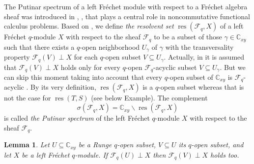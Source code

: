 \documentclass[12pt,reqno]{amsart}%
\theoremstyle{plain}
\newtheorem{lemma}{Lemma}
\numberwithin{theorem}{section} \numberwithin{equation}{section}
\numberwithin{lemma}{section}
\numberwithin{remark}{section}
\numberwithin{example}{section}
\numberwithin{proposition}{section}
\numberwithin{definition}{section}
\numberwithin{corollary}{section}
\begin{document}
The Putinar spectrum of a left Fr\'{e}chet module with respect to a
Fr\'{e}chet algebra sheaf was introduced in \cite{DosiMS10}, \cite{DosJOT10},
that plays a central role in noncommutative functional calculus problems.
Based on \cite[Definition 4.2]{DosJOT10}, we define \textit{the resolvent set
}$\operatorname*{res}\left(  \mathcal{F}_{q},X\right)  $ of a left Fr\'{e}chet
$q$-module $X$ with respect to the sheaf $\mathcal{F}_{q}$ to be a subset of
those $\gamma\in\mathbb{C}_{xy}$ such that there exists a $q$-open
neighborhood $U_{\gamma}$ of $\gamma$ with the transversality property
$\mathcal{F}_{q}\left(  V\right)  \perp X$ for each $q$-open subset
$V\subseteq U_{\gamma}$. Actually, in \cite[Definition 4.2]{DosJOT10} it is
assumed that $\mathcal{F}_{q}\left(  V\right)  \perp X$ holds only for every
$q$-open $\mathcal{F}_{q}$-acyclic subset $V\subseteq U_{\gamma}$. But we can
skip this moment taking into account that every $q$-open subset of
$\mathbb{C}_{xy}$ is $\mathcal{F}_{q}$-acyclic \cite{DosiSS}. By its very
definition, $\operatorname*{res}\left(  \mathcal{F}_{q},X\right)  $ is a
$q$-open subset whereas that is not the case for $\operatorname{res}\left(
T,S\right)  $ (see below Example). The complement%
\[
\sigma\left(  \mathcal{F}_{q},X\right)  =\mathbb{C}_{xy}\backslash
\operatorname*{res}\left(  \mathcal{F}_{q},X\right)
\]
is called \textit{the Putinar spectrum }of the left Fr\'{e}chet $q$-module $X$
with respect to the sheaf $\mathcal{F}_{q}$.

\begin{lemma}
\label{corFUV}Let $U\subseteq\mathbb{C}_{xy}$ be a Runge $q$-open subset,
$V\subseteq U$ its $q$-open subset, and let $X$ be a left Fr\'{e}chet
$q$-module. If $\mathcal{F}_{q}\left(  U\right)  \perp X$ then $\mathcal{F}%
_{q}\left(  V\right)  \perp X$ holds too.
\end{lemma}
\end{document}
